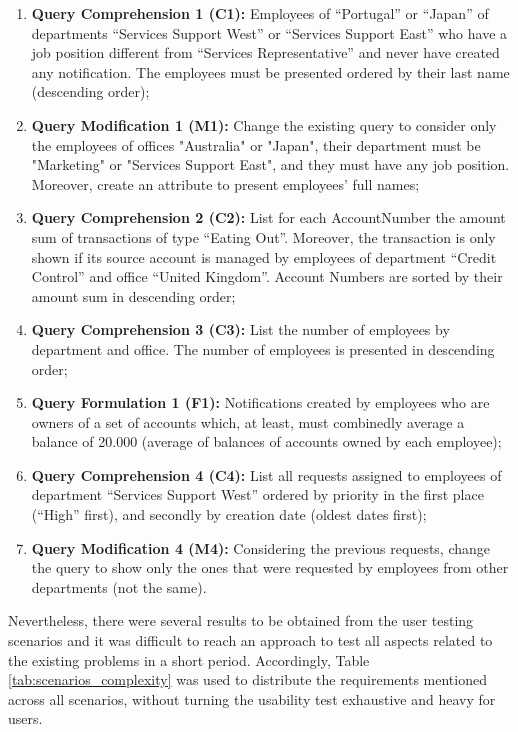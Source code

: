 \begin{enumerate}
    \item \textbf{Query Comprehension 1 (C1): }Employees of “Portugal” or “Japan” of departments “Services Support West” or “Services Support East” who have a job position different from “Services Representative” and never have created any notification. The employees must be presented ordered by their last name (descending order);
    \item \textbf{Query Modification 1 (M1): }Change the existing query to consider only the employees of offices "Australia" or "Japan", their department must be "Marketing" or "Services Support East", and they must have any job position. Moreover, create an attribute to present employees’ full names;
    \item \textbf{Query Comprehension 2 (C2): }List for each AccountNumber the amount sum of transactions of type “Eating Out”. Moreover, the transaction is only shown if its source account is managed by employees of department “Credit Control” and office “United Kingdom”. Account Numbers are sorted by their amount sum in descending order;
    \item \textbf{Query Comprehension 3 (C3): }List the number of employees by department and office. The number of employees is presented in descending order;
    \item \textbf{Query Formulation 1 (F1): }Notifications created by employees who are owners of a set of accounts which, at least, must combinedly average a balance of 20.000 (average of balances of accounts owned by each employee);
    \item \textbf{Query Comprehension 4 (C4): }List all requests assigned to employees of department “Services Support West” ordered by priority in the first place (“High” first), and secondly by creation date (oldest dates first);
    \item \textbf{Query Modification 4 (M4): }Considering the previous requests, change the query to show only the ones that were requested by employees from other departments (not the same).
\end{enumerate}

Nevertheless, there were several results to be obtained from the user testing scenarios and it was difficult to reach an approach to test all aspects related to the existing problems in a short period. Accordingly, Table \ref{tab:scenarios_complexity} was used to distribute the requirements mentioned across all scenarios, without turning the usability test exhaustive and heavy for users.

